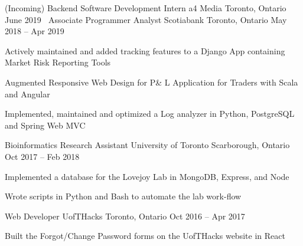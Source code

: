\begin{cventries}
  \cventry
    {(Incoming) Backend Software Development Intern}
    {a4 Media}
    {Toronto, Ontario}
    {June 2019}
    {
      $\:$
    }
  \cventry
    {Associate Programmer Analyst}
    {Scotiabank}
    {Toronto, Ontario}
    {May 2018 -- Apr 2019}
    {
      \begin{cvitems}
        \item {Actively maintained and added tracking features to a Django App containing Market Risk Reporting Tools}
        \item {Augmented Responsive Web Design for P\& L Application for Traders with Scala and Angular}
        \item {Implemented, maintained and optimized a Log analyzer in Python, PostgreSQL and Spring Web MVC}
      \end{cvitems}
    }

  \cventry
    {Bioinformatics Research Assistant}
    {University of Toronto}
    {Scarborough, Ontario}
    {Oct 2017 -- Feb 2018}
    {
      \begin{cvitems}
        \item {Implemented a database for the Lovejoy Lab in MongoDB, Express, and Node}
        \item {Wrote scripts in Python and Bash to automate the lab work-flow}
      \end{cvitems}
    }
  \cventry
    {Web Developer}
    {UofTHacks}
    {Toronto, Ontario}
    {Oct 2016 -- Apr 2017}
    {
      \begin{cvitems}
        \item {Built the Forgot/Change Password forms on the UofTHacks website in React}
      \end{cvitems}
    }
\end{cventries}
